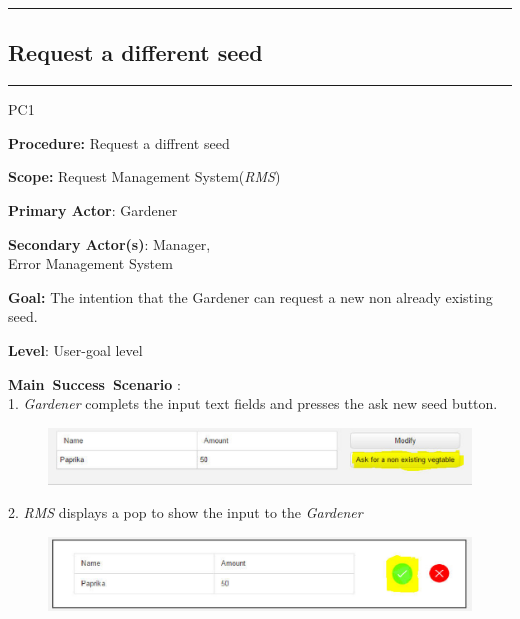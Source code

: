 \hrule
\vspace{0.5cm}

\break


\subsection{Request a different seed}
\vspace{0.5cm}
\hrule
\hfill
\begin{lyxlist}{PC1}
\small{
\item [\textbf{Procedure:}] Request a diffrent seed
\item [\textbf{Scope:}] Request Management System(\emph{RMS})
\item [\textbf{Primary Actor}:] Gardener
\item [\textbf{Secondary Actor(s)}:] Manager,\\
Error Management System
\item [\textbf{Goal:}] The intention that the Gardener can request a new
non already existing seed.
\item [\textbf{Level}:] User-goal level
\item [\textbf{Main~Success~Scenario}]:\\
1. \emph{Gardener} complets the input text fields and presses the ask new seed
button.\\
\item 
\begin{figure}[H]
\includegraphics[width=1\textwidth]{images/AskForANonExistingVegtable.eps}
\end{figure}
2. \emph{RMS} displays a pop to show the input to the \emph{Gardener}\\
 \begin{figure}[H]
\includegraphics[width=1\textwidth]{images/AskForANonExistingVegtablePopUp.eps}
\end{figure}

}
\end{lyxlist}
